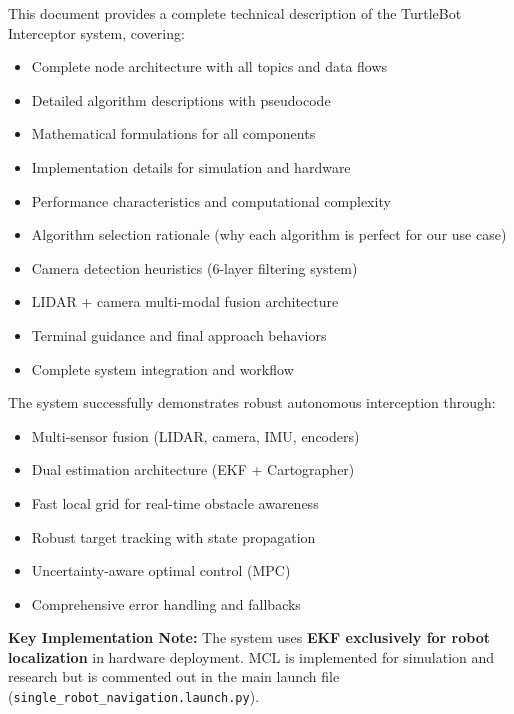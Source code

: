 \documentclass[11pt]{article}
\begin{document}
This document provides a complete technical description of the TurtleBot Interceptor system, covering:

\begin{itemize}
    \item Complete node architecture with all topics and data flows
    \item Detailed algorithm descriptions with pseudocode
    \item Mathematical formulations for all components
    \item Implementation details for simulation and hardware
    \item Performance characteristics and computational complexity
    \item Algorithm selection rationale (why each algorithm is perfect for our use case)
    \item Camera detection heuristics (6-layer filtering system)
    \item LIDAR + camera multi-modal fusion architecture
    \item Terminal guidance and final approach behaviors
    \item Complete system integration and workflow
\end{itemize}

The system successfully demonstrates robust autonomous interception through:
\begin{itemize}
    \item Multi-sensor fusion (LIDAR, camera, IMU, encoders)
    \item Dual estimation architecture (EKF + Cartographer)
    \item Fast local grid for real-time obstacle awareness
    \item Robust target tracking with state propagation
    \item Uncertainty-aware optimal control (MPC)
    \item Comprehensive error handling and fallbacks
\end{itemize}

\textbf{Key Implementation Note:} The system uses \textbf{EKF exclusively for robot localization} in hardware deployment. MCL is implemented for simulation and research but is commented out in the main launch file (\texttt{single\_robot\_navigation.launch.py}).
\end{document}
